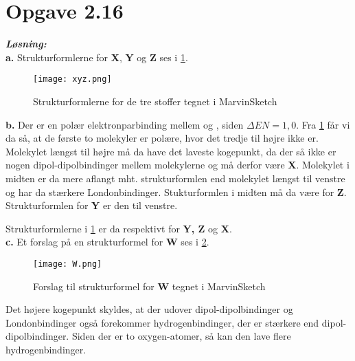 \documentclass{report}
\newcommand{\sol}{\setlength{\parindent}{0cm}\textbf{\textit{Løsning:}}\setlength{\parindent}{1cm}}
\begin{document}
\section*{Opgave 2.16}
\sol \\ 
\textbf{a.} 
Strukturformlerne for \textbf{X}, \textbf{Y} og \textbf{Z} ses i \cref{fig:xyz}.
\begin{figure}[H]
\begin{center}
  \texttt{[image: xyz.png]}
\end{center}
\caption{Strukturformlerne for de tre stoffer tegnet i MarvinSketch}
\label{fig:xyz}
\end{figure}
\noindent\textbf{b.} 
Der er en polær elektronparbinding mellem  og , siden $\Delta EN=1,0$.
Fra \cref{fig:xyz} får vi da så, at de første to molekyler er polære, hvor det tredje til højre ikke er.
Molekylet længst til højre må da have det laveste kogepunkt, da der så ikke er nogen dipol-dipolbindinger mellem molekylerne og må derfor være \textbf{X}.
Molekylet i midten er da mere aflangt mht. strukturformlen end molekylet længst til venstre og har da stærkere Londonbindinger.
Stukturformlen i midten må da være for \textbf{Z}.
Strukturformlen for \textbf{Y} er den til venstre.

Strukturformlerne i \cref{fig:xyz} er da respektivt for \textbf{Y, Z} og \textbf{X}. \\[1ex]
\noindent \textbf{c.} Et forslag på en strukturformel for \textbf{W} ses i \cref{fig:W}.
\begin{figure}[H]
\begin{center}
  \texttt{[image: W.png]}
\end{center}
\caption{Forslag til strukturformel for \textbf{W} tegnet i MarvinSketch}
\label{fig:W}
\end{figure}
Det højere kogepunkt skyldes, at der udover dipol-dipolbindinger og Londonbindinger også forekommer hydrogenbindinger, der er stærkere end dipol-dipolbindinger.
Siden der er to oxygen-atomer, så kan den lave flere hydrogenbindinger.
\end{document}
